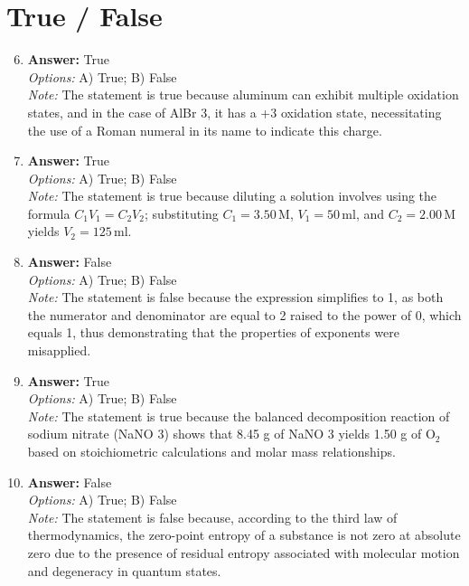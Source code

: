 \documentclass[12pt]{article}
\begin{document}
\section*{True / False}
\begin{enumerate}[label=\arabic*.]
\setcounter{enumi}{5}
\item \textbf{Answer:} True
\\ \textit{Options:} A) True; B) False
\\ \textit{Note:} The statement is true because aluminum can exhibit multiple oxidation states, and in the case of AlBr 3, it has a +3 oxidation state, necessitating the use of a Roman numeral in its name to indicate this charge.
\item \textbf{Answer:} True
\\ \textit{Options:} A) True; B) False
\\ \textit{Note:} The statement is true because diluting a solution involves using the formula \(C_1 V_1 = C_2 V_2\); substituting \(C_1 = 3.50 \, \text{M}\), \(V_1 = 50 \, \text{ml}\), and \(C_2 = 2.00 \, \text{M}\) yields \(V_2 = 125 \, \text{ml}\).
\item \textbf{Answer:} False
\\ \textit{Options:} A) True; B) False
\\ \textit{Note:} The statement is false because the expression simplifies to 1, as both the numerator and denominator are equal to 2 raised to the power of 0, which equals 1, thus demonstrating that the properties of exponents were misapplied.
\item \textbf{Answer:} True
\\ \textit{Options:} A) True; B) False
\\ \textit{Note:} The statement is true because the balanced decomposition reaction of sodium nitrate (NaNO 3) shows that 8.45 g of NaNO 3 yields 1.50 g of O$_{2}$ based on stoichiometric calculations and molar mass relationships.
\item \textbf{Answer:} False
\\ \textit{Options:} A) True; B) False
\\ \textit{Note:} The statement is false because, according to the third law of thermodynamics, the zero-point entropy of a substance is not zero at absolute zero due to the presence of residual entropy associated with molecular motion and degeneracy in quantum states.
\end{enumerate}
\end{document}
